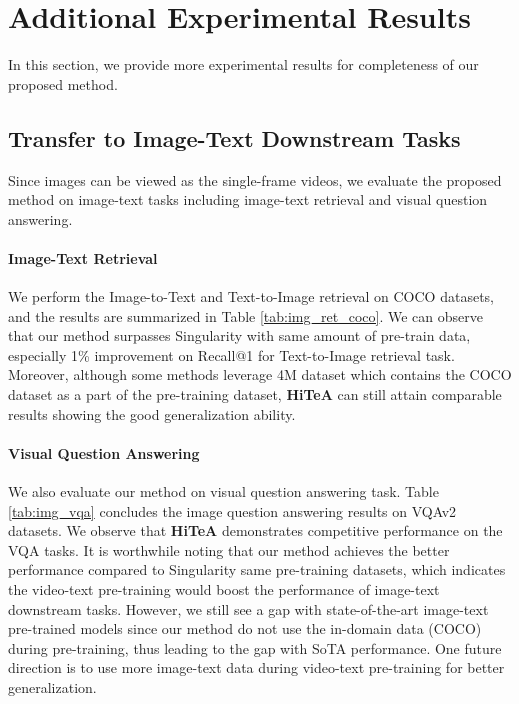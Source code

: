 \documentclass[10pt,twocolumn,letterpaper]{article}
\newcommand{\modelname}{\textbf{HiTeA}\xspace}
\begin{document}
{\small


}


\clearpage
\appendix
\section{Additional Experimental Results}
In this section, we provide more experimental results for completeness of our proposed method.
\subsection{Transfer to Image-Text Downstream Tasks}
Since images can be viewed as the single-frame videos, we evaluate the proposed method on image-text tasks including image-text retrieval and visual question answering.
\paragraph{Image-Text Retrieval}
We perform the Image-to-Text and Text-to-Image retrieval on COCO datasets, and the results are summarized in Table \ref{tab:img_ret_coco}. We can observe that our method surpasses Singularity \cite{lei2022singularity} with same amount of pre-train data, especially 1\% improvement on Recall@1 for Text-to-Image retrieval task. Moreover, although some methods \cite{li2021align, chen2020uniter} leverage 4M dataset which contains the COCO dataset as a part of the pre-training dataset, \modelname can still attain comparable results showing the good generalization ability.

\paragraph{Visual Question Answering}
We also evaluate our method on visual question answering task. Table \ref{tab:img_vqa} concludes the image question answering results on VQAv2 \cite{goyal2017vqa} datasets. We observe that \modelname demonstrates competitive performance on the VQA tasks. It is worthwhile noting that our method achieves the better performance compared to Singularity \cite{lei2022singularity} same pre-training datasets, which indicates the video-text pre-training would boost the performance of image-text downstream tasks. However, we still see a gap with state-of-the-art image-text pre-trained models since our method do not use the in-domain data (\eg COCO) during pre-training, thus leading to the gap with SoTA performance. One future direction is to use more image-text data during video-text pre-training for better generalization.
\end{document}
